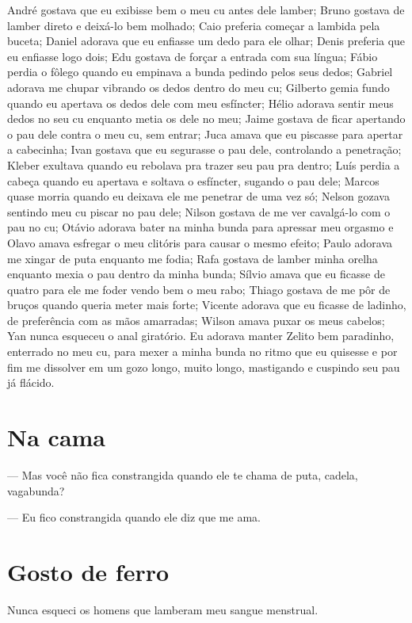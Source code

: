 André gostava que eu exibisse bem o meu cu antes dele lamber; Bruno
gostava de lamber direto e deixá-lo bem molhado; Caio preferia começar a
lambida pela buceta; Daniel adorava que eu enfiasse um dedo para ele
olhar; Denis preferia que eu enfiasse logo dois; Edu gostava de forçar a
entrada com sua língua; Fábio perdia o fôlego quando eu empinava a bunda
pedindo pelos seus dedos; Gabriel adorava me chupar vibrando os dedos
dentro do meu cu; Gilberto gemia fundo quando eu apertava os dedos dele
com meu esfíncter; Hélio adorava sentir meus dedos no seu cu enquanto
metia os dele no meu; Jaime gostava de ficar apertando o pau dele contra
o meu cu, sem entrar; Juca amava que eu piscasse para apertar a
cabecinha; Ivan gostava que eu segurasse o pau dele, controlando a
penetração; Kleber exultava quando eu rebolava pra trazer seu pau pra
dentro; Luís perdia a cabeça quando eu apertava e soltava o esfíncter,
sugando o pau dele; Marcos quase morria quando eu deixava ele me
penetrar de uma vez só; Nelson gozava sentindo meu cu piscar no pau
dele; Nilson gostava de me ver cavalgá-lo com o pau no cu; Otávio
adorava bater na minha bunda para apressar meu orgasmo e Olavo amava
esfregar o meu clitóris para causar o mesmo efeito; Paulo adorava me
xingar de puta enquanto me fodia; Rafa gostava de lamber minha orelha
enquanto mexia o pau dentro da minha bunda; Sílvio amava que eu ficasse
de quatro para ele me foder vendo bem o meu rabo; Thiago gostava de me
pôr de bruços quando queria meter mais forte; Vicente adorava que eu
ficasse de ladinho, de preferência com as mãos amarradas; Wilson amava
puxar os meus cabelos; Yan nunca esqueceu o anal giratório. Eu adorava
manter Zelito bem paradinho, enterrado no meu cu, para mexer a minha
bunda no ritmo que eu quisesse e por fim me dissolver em um gozo longo,
muito longo, mastigando e cuspindo seu pau já flácido.

\chapter{Na cama}

\mbox{}\indent{}--- Mas você não fica constrangida quando ele te chama de puta, cadela,
vagabunda?

--- Eu fico constrangida quando ele diz que me ama.

\chapter{Gosto de ferro}

Nunca esqueci os homens que lamberam meu sangue menstrual.


